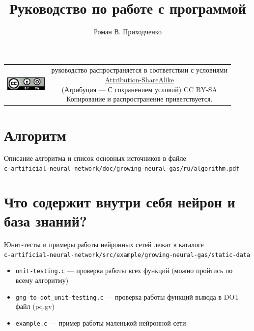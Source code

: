 \documentclass[unicode, 12pt, a4paper,oneside,fleqn]{article}
\author{Роман В. Приходченко}
\title{Руководство по работе с программой}
\begin{document}
\renewcommand\bibname{СПИСОК ЛИТЕРАТУРЫ}
\renewcommand\refname{\centering Список литературы}
\renewcommand\contentsname{\centering Содержание}



\makeatletter %
\maketitle

\begin{table}[ht]
  \begin{tabular}{cc}
    \includegraphics[width=2cm]{../../../CC_BY-SA_88x31.png} &
    \shortstack{руководство распространяется в соответствии с
      условиями\\
      \href{http://creativecommons.org/licenses/by-sa/3.0/}{Attribution-ShareAlike} \\
      (Атрибуция — С сохранением условий) CC BY-SA \\
      Копирование и распространение приветствуется.}
  \end{tabular}
\end{table}

\newpage
\tableofcontents

\section{Алгоритм}
Описание алгоритма и список основных источников в файле\\
\verb'c-artificial-neural-network/doc/growing-neural-gas/ru/algorithm.pdf'


\clearpage
\section{Что содержит внутри себя нейрон и база знаний?}

Юнит-тесты и примеры работы нейронных сетей лежат в каталоге\\
\verb'c-artificial-neural-network/src/example/growing-neural-gas/static-data'
\begin{itemize}
\item \verb'unit-testing.c' --- проверка работы всех функций (можно
  пройтись по всему алгоритму)
\item \verb'gng-to-dot_unit-testing.c' --- проверка работы функций
  вывода в DOT файл (pq.gv)
\item \verb'example.c' --- пример работы маленькой нейронной сети
\end{itemize}
\end{document}
